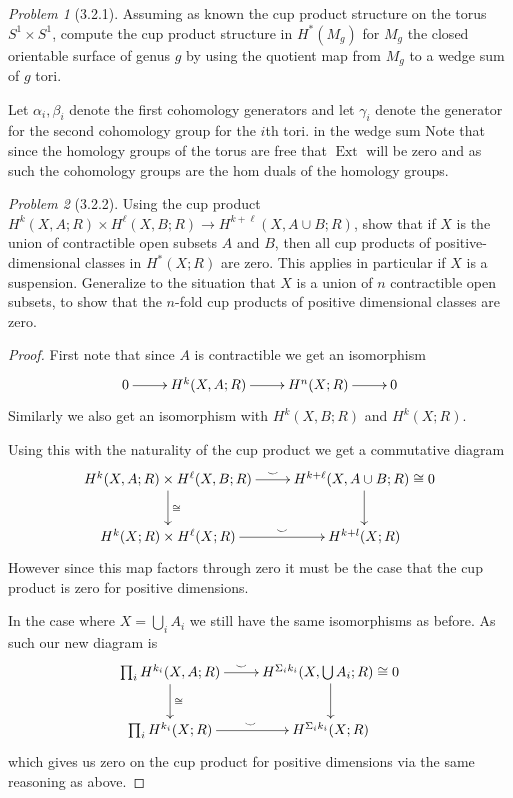 \documentclass[10pt]{article}
\newcommand{\sk}{\vskip 10mm}
\DeclareMathOperator{\Ext}{Ext}
\theoremstyle{remark}
\newtheorem{problem}{Problem}
\begin{document}
\begin{problem}[3.2.1]
  Assuming as known the cup product structure on the torus $S^1\times S^1$,
  compute the cup product structure in $H^*(M_g)$ for $M_g$ the closed
  orientable surface of genus $g$ by using the quotient map from $M_g$
  to a wedge sum of $g$ tori.
\end{problem}

Let $\alpha_i,\beta_i$ denote the first cohomology generators and
let $\gamma_i$ denote the generator for the second cohomology group for the $i$th
tori. in the wedge sum Note that since the homology groups of the torus are
free that $\Ext$ will be zero and as such the cohomology groups are the hom duals
of the homology groups.

\sk

\begin{problem}[3.2.2]
  Using the cup product
  $H^k(X,A;R)\times H^\ell(X,B;R)\rightarrow H^{k+\ell}(X,A\cup B;R)$, show that
  if $X$ is the union of contractible open subsets $A$ and $B$, then all cup
  products of positive-dimensional classes in $H^*(X;R)$ are zero. This applies
  in particular if $X$ is a suspension. Generalize to the situation that $X$ is
  a union of $n$ contractible open subsets, to show that the $n$-fold cup
  products of positive dimensional classes are zero.
\end{problem}

\begin{proof}
  First note that since $A$ is contractible we get an isomorphism
  \[
    \xymatrix{
      0 \ar[r] & H^k(X,A;R) \ar[r] & H^n(X;R) \ar[r] & 0
    }
  \]
  Similarly we also get an isomorphism with $H^k(X,B;R)$ and $H^k(X;R)$.

  Using this with the naturality of the cup product we get a commutative
  diagram
  \[
    \xymatrix{
      H^k(X,A;R)\times H^\ell(X,B;R) \ar[r]^-\smile \ar[d]^{\cong }& H^{k+\ell}(X,A\cup B;R)\cong 0 \ar[d]\\
      H^k(X;R)\times H^\ell(X;R) \ar[r]^-\smile & H^{k+l}(X;R)
    }
  \]
  However since this map factors through zero it must be the case that
  the cup product is zero for positive dimensions.

  In the case where $X=\bigcup_i A_i$ we still have the same isomorphisms as before.
  As such our new diagram is
  \[
    \xymatrix{
      \prod_i H^{k_i}(X,A;R) \ar[r]^-{\smile} \ar[d]^{\cong}& H^{\Sigma_ik_i}(X,\bigcup A_i;R)\cong 0 \ar[d]\\
      \prod_i H^{k_i}(X;R) \ar[r]^{\smile} & H^{\Sigma_i k_i}(X;R)
    }
  \]
  which gives us zero on the cup product for positive dimensions via the same
  reasoning as above.
\end{proof}
\end{document}
